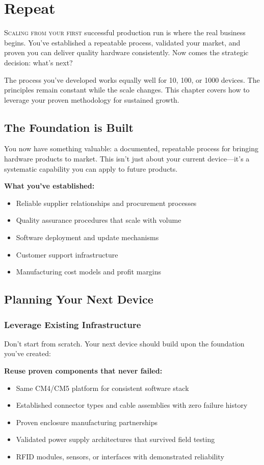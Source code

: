 \chapter{Repeat}

\lettrine{S}{caling from your first} successful production run is where the real business begins. You've established a repeatable process, validated your market, and proven you can deliver quality hardware consistently. Now comes the strategic decision: what's next?

The process you've developed works equally well for 10, 100, or 1000 devices. The principles remain constant while the scale changes. This chapter covers how to leverage your proven methodology for sustained growth.

\section{The Foundation is Built}

You now have something valuable: a documented, repeatable process for bringing hardware products to market. This isn't just about your current device—it's a systematic capability you can apply to future products.

\textbf{What you've established:}
\begin{itemize}
\item Reliable supplier relationships and procurement processes
\item Quality assurance procedures that scale with volume
\item Software deployment and update mechanisms
\item Customer support infrastructure
\item Manufacturing cost models and profit margins
\end{itemize}

\section{Planning Your Next Device}

\subsection{Leverage Existing Infrastructure}

Don't start from scratch. Your next device should build upon the foundation you've created:

\textbf{Reuse proven components that never failed:}
\begin{itemize}
\item Same CM4/CM5 platform for consistent software stack
\item Established connector types and cable assemblies with zero failure history
\item Proven enclosure manufacturing partnerships
\item Validated power supply architectures that survived field testing
\item RFID modules, sensors, or interfaces with demonstrated reliability
\end{itemize}

